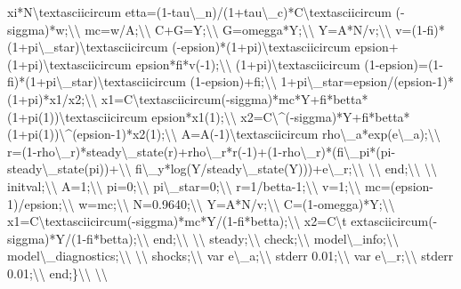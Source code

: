 \documentclass[10pt,math=newtx,citestyle=gb7714-2015,bibstyle=gb7714-2015]{elegantbook}
\begin{document}
	xi*N\textbackslash{}textasciicircum etta=(1-tau\textbackslash{}\_n)/(1+tau\textbackslash{}\_c)*C\textbackslash{}textasciicircum (-siggma)*w;\textbackslash{}\textbackslash{}
	mc=w/A;\textbackslash{}\textbackslash{}
	C+G=Y;\textbackslash{}\textbackslash{}
	G=omegga*Y;\textbackslash{}\textbackslash{}
	Y=A*N/v;\textbackslash{}\textbackslash{}
	v=(1-fi)*(1+pi\textbackslash{}\_star)\textbackslash{}textasciicircum (-epsion)*(1+pi)\textbackslash{}textasciicircum epsion+(1+pi)\textbackslash{}textasciicircum epsion*fi*v(-1);\textbackslash{}\textbackslash{}
	(1+pi)\textbackslash{}textasciicircum (1-epsion)=(1-fi)*(1+pi\textbackslash{}\_star)\textbackslash{}textasciicircum (1-epsion)+fi;\textbackslash{}\textbackslash{}
	1+pi\textbackslash{}\_star=epsion/(epsion-1)*(1+pi)*x1/x2;\textbackslash{}\textbackslash{}
	x1=C\textbackslash{}textasciicircum(-siggma)*mc*Y+fi*betta*(1+pi(1))\textbackslash{}textasciicircum epsion*x1(1);\textbackslash{}\textbackslash{}
	x2=C\textbackslash{}\^{}(-siggma)*Y+fi*betta*(1+pi(1))\textbackslash{}\^{}(epsion-1)*x2(1);\textbackslash{}\textbackslash{}
	A=A(-1)\textbackslash{}textasciicircum rho\textbackslash{}\_a*exp(e\textbackslash{}\_a);\textbackslash{}\textbackslash{}
	r=(1-rho\textbackslash{}\_r)*steady\textbackslash{}\_state(r)+rho\textbackslash{}\_r*r(-1)+(1-rho\textbackslash{}\_r)*(fi\textbackslash{}\_pi*(pi-steady\textbackslash{}\_state(pi))+\textbackslash{}\textbackslash{}
	fi\textbackslash{}\_y*log(Y/steady\textbackslash{}\_state(Y)))+e\textbackslash{}\_r;\textbackslash{}\textbackslash{}
	\textbackslash{}\textbackslash{}
	end;\textbackslash{}\textbackslash{}
	\textbackslash{}\textbackslash{}
	initval;\textbackslash{}\textbackslash{}
	A=1;\textbackslash{}\textbackslash{}
	pi=0;\textbackslash{}\textbackslash{}
	pi\textbackslash{}\_star=0;\textbackslash{}\textbackslash{}
	r=1/betta-1;\textbackslash{}\textbackslash{}
	v=1;\textbackslash{}\textbackslash{}
	mc=(epsion-1)/epsion;\textbackslash{}\textbackslash{}
	w=mc;\textbackslash{}\textbackslash{}
	N=0.9640;\textbackslash{}\textbackslash{}
	Y=A*N/v;\textbackslash{}\textbackslash{}
	C=(1-omegga)*Y;\textbackslash{}\textbackslash{}
	x1=C\textbackslash{}textasciicircum(-siggma)*mc*Y/(1-fi*betta);\textbackslash{}\textbackslash{}
	x2=C\textbackslash{}t extasciicircum(-siggma)*Y/(1-fi*betta);\textbackslash{}\textbackslash{}
	end;\textbackslash{}\textbackslash{}
	\textbackslash{}\textbackslash{}
	steady;\textbackslash{}\textbackslash{}
	check;\textbackslash{}\textbackslash{}
	model\textbackslash{}\_info;\textbackslash{}\textbackslash{}
	model\textbackslash{}\_diagnostics;\textbackslash{}\textbackslash{}
	\textbackslash{}\textbackslash{}
	shocks;\textbackslash{}\textbackslash{}
	var e\textbackslash{}\_a;\textbackslash{}\textbackslash{}
	stderr 0.01;\textbackslash{}\textbackslash{}
	var e\textbackslash{}\_r;\textbackslash{}\textbackslash{}
	stderr 0.01;\textbackslash{}\textbackslash{}
	end;\}\textbackslash{}\textbackslash{}
	\textbackslash{}\textbackslash{}
	
\end{document}
